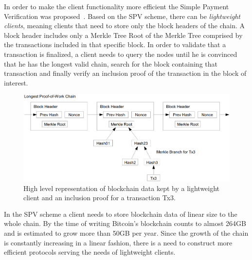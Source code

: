 In order to make the client functionality more efficient the Simple Payment Verification was proposed~\cite{nakamoto}. Based on the SPV scheme, there can be \emph{lightweight clients}, meaning clients that need to store only the block headers of the chain. A block header includes only a Merkle Tree Root of the Merkle Tree comprised by
the transactions included in that specific block. In order to validate that a transaction is
finalized, a client needs to query the nodes until he is convinced that he has the longest
valid chain, search for the block containing that transaction and finally verify an inclusion
proof of the transaction in the block of interest.

\begin{figure}[h!]
	\begin{center}
		\includegraphics[scale=0.3]{figures/SPV_nakamoto.png}
	\end{center}
	\caption{High level representation of blockchain data kept by a lightweight client
	 and an inclusion proof for a transaction Tx3.\cite{nakamoto}}
	\label{fig:SPV_nakamoto}
\end{figure}

In the SPV scheme a client needs to store blockchain data of linear size to the whole chain. By
the time of writing Bitcoin's blockchain counts to almost 264GB and is estimated to grow more
than 50GB per year.  Since the growth of the chain is constantly increasing in a linear fashion, there is a need
to construct more efficient protocols serving the needs of lightweight clients. 
